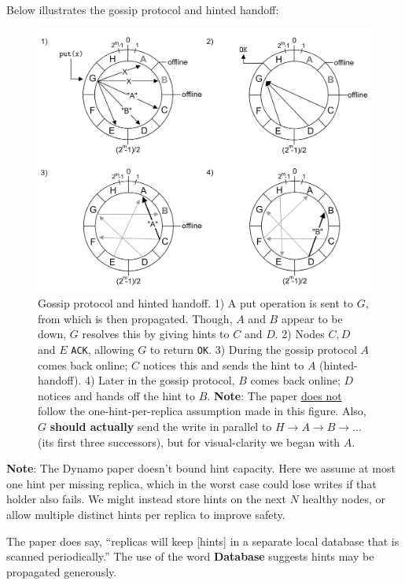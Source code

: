     \newpage 
    \noindent
    Below illustrates the gossip protocol and hinted handoff:
    \begin{figure}[h]
        
        \centering
        \includegraphics[width=\textwidth]{Sections/dyn/gossip_2.png}
        \caption{Gossip protocol and hinted handoff. 1) A put operation is sent to $G$, from which is then propagated. Though, $A$ and $B$ appear to be down, $G$ resolves this by giving hints to $C$ and $D$. 2) Nodes $C,D$ and $E$ \texttt{ACK}, allowing $G$ to return \texttt{OK}. 3) During the gossip protocol $A$ comes back online; $C$ notices this and sends the hint to $A$ (hinted-handoff). 4) Later in the 
        gossip protocol, $B$ comes back online; $D$ notices and hands off the hint to $B$. \textbf{Note}: The paper \underline{does not} follow the one-hint-per-replica assumption made in this figure. Also, $G$ \textbf{should actually} send the write in parallel to $H\to A\to B\to\dots$ (its first three successors), but for visual-clarity we began with $A$.}
        \label{fig:gossip}
    \end{figure}

    \vspace{-1em}
    \begin{Note}
        \textbf{Note}:
        The Dynamo paper doesn't bound hint capacity. Here we assume at most one hint per missing replica, which in the worst case could lose writes if that holder also fails. 
        We might instead store hints on the next $N$ healthy nodes, or allow multiple distinct hints per replica to improve safety.
        
        The paper does say, ``replicas will keep [hints] in a 
        separate local database that is scanned periodically.'' The use of the word \textbf{Database} suggests hints may be propagated generously.
    \end{Note}
    \newpage 

